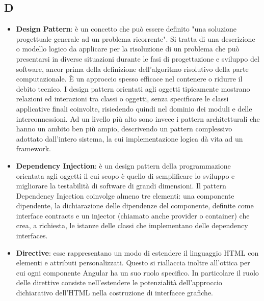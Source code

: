 \subsection{D}
\begin{itemize} 
	\item
	\textbf{Design Pattern}: è un concetto che può essere definito "una soluzione progettuale generale ad un problema ricorrente". Si tratta di una descrizione o modello logico da applicare per la risoluzione di un problema che può presentarsi in diverse situazioni durante le fasi di progettazione e sviluppo del software, ancor prima della definizione dell'algoritmo risolutivo della parte computazionale. È un approccio spesso efficace nel contenere o ridurre il debito tecnico.
	I design pattern orientati agli oggetti tipicamente mostrano relazioni ed interazioni tra classi o oggetti, senza specificare le classi applicative finali coinvolte, risiedendo quindi nel dominio dei moduli e delle interconnessioni. Ad un livello più alto sono invece i pattern architetturali che hanno un ambito ben più ampio, descrivendo un pattern complessivo adottato dall'intero sistema, la cui implementazione logica dà vita ad un framework.
	\item
	\textbf{Dependency Injection}: è un design pattern della programmazione orientata agli oggetti il cui scopo è quello di semplificare lo sviluppo e migliorare la testabilità di software di grandi dimensioni. Il pattern Dependency Injection coinvolge almeno tre elementi: una componente dipendente, la dichiarazione delle dipendenze del componente, definite come interface contracts e un injector (chiamato anche provider o container) che crea, a richiesta, le istanze delle classi che implementano delle dependency interfaces.
	\item
	\textbf{Directive}: esse rappresentano un modo di estendere il linguaggio HTML con elementi e attributi personalizzati. Questo si riallaccia inoltre all’ottica per cui ogni componente Angular ha un suo ruolo specifico. In particolare il ruolo delle direttive consiste nell’estendere le potenzialità dell’approccio dichiarativo dell’HTML nella costruzione di interfacce grafiche.
\end{itemize}